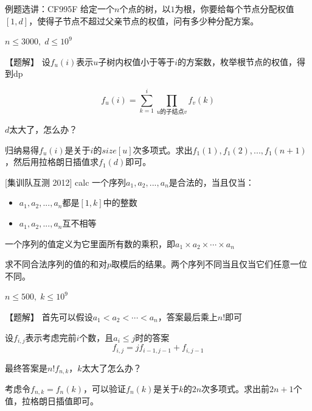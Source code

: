 \documentclass{beamer}
\begin{document}
\begin{frame}{例题选讲：CF995F}
    给定一个$n$个点的树，以$1$为根，你要给每个节点分配权值$[1,d]$，使得子节点不超过父亲节点的权值，问有多少种分配方案。

    $n\leq 3000,\; d\leq 10^{9}$

    \pause
    \vspace{1em}
    【题解】 设$f_{u}(i)$表示$u$子树内权值小于等于$i$的方案数\pause，枚举根节点的权值，得到dp
    
    \begin{equation*}
        f_{u}(i)=\sum_{k=1}^i \prod_{u\text{的子结点}v} f_{v}(k)
    \end{equation*}

    $d$太大了，怎么办？

    \pause
    \vspace{1em}
    归纳易得$f_u(i)$是关于$i$的$size[u]$次多项式。求出$f_1(1),f_1(2),...,f_1(n+1)$，然后用拉格朗日插值求$f_1(d)$即可。
\end{frame}

\begin{frame}{[集训队互测 2012] calc}
    \small 
    一个序列$a_1,a_2,...,a_n$是合法的，当且仅当：
    \begin{itemize}
        \item $a_1,a_2,...,a_n$都是$[1,k]$中的整数
        \item $a_1,a_2,...,a_n$互不相等
    \end{itemize}

    一个序列的值定义为它里面所有数的乘积，即$a_1\times a_2\times \cdots \times a_n$

    求不同合法序列的值的和对$p$取模后的结果。两个序列不同当且仅当它们任意一位不同。

    $n\leq 500,\;k\leq 10^9$

    \pause
    \vspace{1em}
    【题解】 首先可以假设$a_1<a_2<\cdots < a_n$，答案最后乘上$n!$即可

    \pause
    设$f_{i,j}$表示考虑完前$i$个数，且$a_i\leq j$时的答案
    \pause
    \begin{equation*}
        f_{i,j}=jf_{i-1,j-1} + f_{i,j-1}
    \end{equation*}

    最终答案是$n!f_{n,k}$，$k$太大了怎么办？

    \pause
    考虑令$f_{n,k}=f_n(k)$，可以验证$f_n(k)$是关于$k$的$2n$次多项式。求出前$2n+1$个值，拉格朗日插值即可。
\end{frame}
\end{document}
